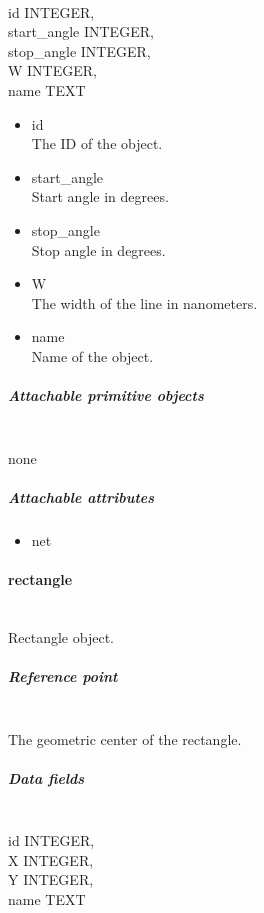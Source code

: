 \documentclass[12pt]{article}
\begin{document}
\mbox{}\\

id INTEGER,\\
start\_angle INTEGER,\\
stop\_angle INTEGER,\\
W INTEGER,\\
name TEXT

\begin{itemize}
\item
  id\\The ID of the object.
\item
  start\_angle\\Start angle in degrees.
\item
  stop\_angle\\Stop angle in degrees.
\item
  W\\The width of the line in nanometers.
\item
  name\\Name of the object.
\end{itemize}

\subparagraph{Attachable primitive
objects}\label{attachable-primitive-objects-1}

\mbox{}\\

none

\subparagraph{Attachable attributes}\label{attachable-attributes-1}

\begin{itemize}
\itemsep1pt\parskip0pt
\item
  net
\end{itemize}

\paragraph{rectangle}\label{rectangle}

\mbox{}\\

Rectangle object.

\subparagraph{Reference point}\label{reference-point-2}

\mbox{}\\

The geometric center of the rectangle.

\subparagraph{Data fields}\label{data-fields-2}

\mbox{}\\

id INTEGER,\\X INTEGER,\\Y INTEGER,\\name TEXT
\end{document}
